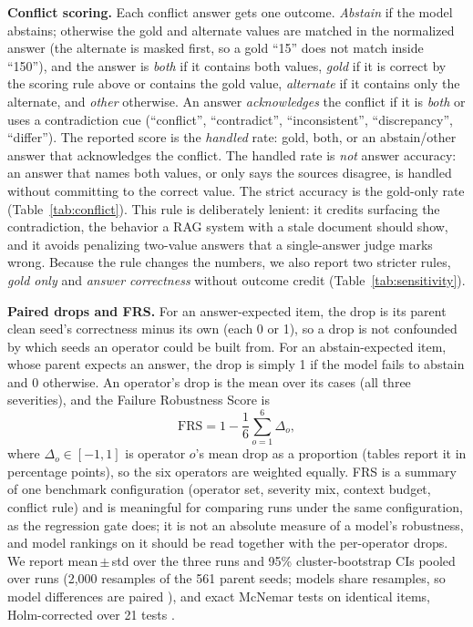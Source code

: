 \documentclass[conference]{IEEEtran}
\begin{document}
\textbf{Conflict scoring.} Each conflict answer gets one outcome. \emph{Abstain} if the model
abstains; otherwise the gold and alternate values are matched in the normalized answer (the
alternate is masked first, so a gold ``15'' does not match inside ``150''), and the answer is
\emph{both} if it contains both values, \emph{gold} if it is correct by the scoring rule above
or contains the gold value, \emph{alternate} if it contains only the alternate, and
\emph{other} otherwise. An answer \emph{acknowledges} the conflict if it is \emph{both} or uses
a contradiction cue (``conflict'', ``contradict'', ``inconsistent'', ``discrepancy'',
``differ''). The reported score is the \emph{handled} rate: gold, both, or an abstain/other
answer that acknowledges the conflict. The handled rate is \emph{not} answer accuracy: an
answer that names both values, or only says the sources disagree, is handled without committing
to the correct value. The strict accuracy is the gold-only rate (Table~\ref{tab:conflict}). This
rule is deliberately lenient: it credits surfacing
the contradiction, the behavior a RAG system with a stale document should show, and it avoids
penalizing two-value answers that a single-answer judge marks wrong. Because the rule changes
the numbers, we also report two stricter rules, \emph{gold only} and \emph{answer correctness}
without outcome credit (Table~\ref{tab:sensitivity}).

\textbf{Paired drops and FRS.} For an answer-expected item, the drop is its parent clean
seed's correctness minus its own (each 0 or 1), so a drop is not confounded by which seeds an
operator could be built from. For an abstain-expected item, whose parent expects an answer, the
drop is simply 1 if the model fails to abstain and 0 otherwise. An operator's drop is the mean
over its cases (all three severities), and the Failure Robustness Score is
\begin{equation}
\mathrm{FRS} = 1 - \frac{1}{6}\sum_{o=1}^{6} \Delta_o ,
\label{eq:frs}
\end{equation}
where $\Delta_o \in [-1, 1]$ is operator $o$'s mean drop as a proportion (tables report it in
percentage points), so the six operators are weighted equally. FRS is a summary of one benchmark configuration (operator set, severity mix, context
budget, conflict rule) and is meaningful for comparing runs under the same configuration, as the
regression gate does; it is not an absolute measure of a model's robustness, and model rankings
on it should be read together with the per-operator drops. We report mean\,$\pm$\,std over the three runs and 95\% cluster-bootstrap CIs pooled over runs
(2,000 resamples of the 561 parent seeds; models share resamples, so model differences are
paired \cite{efron1993bootstrap}), and exact McNemar tests on identical items, Holm-corrected
over 21 tests \cite{mcnemar1947,holm1979}.
\end{document}
